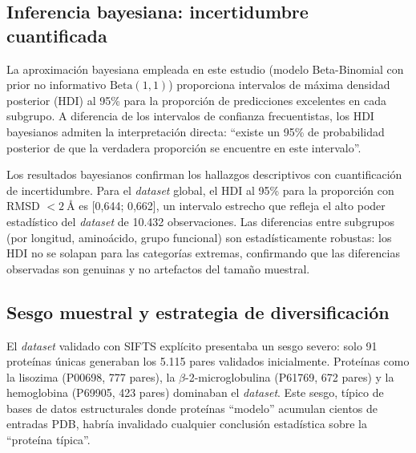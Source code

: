 \subsection{Inferencia bayesiana: incertidumbre cuantificada}
\label{subsec:inferencia_bayesiana_discusion}

La aproximaci\'on bayesiana empleada en este estudio (modelo Beta-Binomial con prior
no informativo $\text{Beta}(1,1)$) proporciona intervalos de m\'axima densidad
posterior (HDI) al 95\% para la proporci\'on de predicciones excelentes en cada
subgrupo. A diferencia de los intervalos de confianza frecuentistas, los HDI
bayesianos admiten la interpretaci\'on directa: ``existe un 95\% de probabilidad
posterior de que la verdadera proporci\'on se encuentre en este intervalo''.

Los resultados bayesianos confirman los hallazgos descriptivos con cuantificaci\'on
de incertidumbre. Para el \textit{dataset} global, el HDI al 95\% para la proporci\'on con
RMSD $< \SI{2}{\angstrom}$ es [0,644; 0,662], un intervalo estrecho que refleja el
alto poder estad\'istico del \textit{dataset} de 10.432 observaciones. Las diferencias entre
subgrupos (por longitud, amino\'acido, grupo funcional) son estad\'isticamente robustas:
los HDI no se solapan para las categor\'ias extremas, confirmando que las diferencias
observadas son genuinas y no artefactos del tama\~no muestral.

\subsection{Sesgo muestral y estrategia de diversificaci\'on}
\label{subsec:sesgo_muestral}

El \textit{dataset} validado con SIFTS expl\'icito presentaba un sesgo severo: solo 91
prote\'inas \'unicas generaban los 5.115 pares validados inicialmente. Prote\'inas como
la lisozima (P00698, 777 pares), la $\beta$-2-microglobulina (P61769, 672 pares) y la
hemoglobina (P69905, 423 pares) dominaban el \textit{dataset}. Este sesgo, t\'ipico de bases
de datos estructurales donde prote\'inas ``modelo'' acumulan cientos de entradas PDB,
habr\'ia invalidado cualquier conclusi\'on estad\'istica sobre la ``prote\'ina t\'ipica''.

